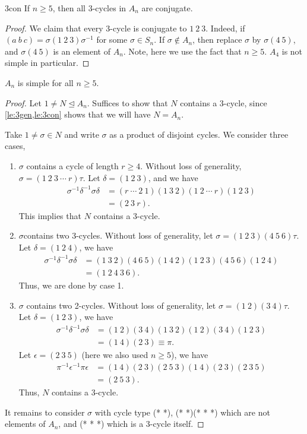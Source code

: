 \begin{lemma}{}{3con}
    If \(n \geq 5\), then all 3-cycles in \(A_n\) are conjugate.
\end{lemma}
\begin{proof}
    We claim that every 3-cycle is conjugate to \(1~2~3\). Indeed, if \((a~b~c) = \sigma(1~2~3)\sigma^{-1}\) for some \(\sigma\in S_n\).
    If \(\sigma \notin A_n\), then replace \(\sigma\) by \(\sigma(4~5)\), and \(\sigma(4~5)\) is an element of \(A_n\). Note, here we use the fact that \(n\geq 5\). \(A_4\) is not simple in particular.
\end{proof}
\begin{theorem}{}{}
    \(A_n\) is simple for all \(n\geq 5\).
\end{theorem}
\begin{proof}
    Let \(1\neq N \trianglelefteq A_n\). Suffices to show that \(N\) contains a 3-cycle, since \cref{le:3gen,le:3con} shows that we will have \(N=A_n\).

    Take \(1\neq \sigma\in N\) and write \(\sigma\) as a product of disjoint cycles. We consider three cases,
    \begin{enumerate}
        \item \(\sigma\) contains a cycle of length \(r \geq 4\). Without loss of generality, \(\sigma = (1~2~3~\cdots~r)\tau\). Let \(\delta = (1~2~3)\), and we have
        \begin{align*}
            \sigma^{-1}\delta^{-1}\sigma\delta &= (r~\cdots~2~1)(1~3~2)(1~2~\cdots~r)(1~2~3)\\
            &=(2~3~r).
        \end{align*}
        This implies that \(N\) contains a 3-cycle.
        \item \(\sigma\)contains two 3-cycles. Without loss of generality, let \(\sigma=(1~2~3)(4~5~6)\tau\). Let \(\delta = (1~2~4)\), we have
        \begin{align*}
            \sigma^{-1}\delta^{-1}\sigma\delta&=(1~3~2)(4~6~5)(1~4~2)(1~2~3)(4~5~6)(1~2~4)\\
            &=(1~2~4~3~6).
        \end{align*}
        Thus, we are done by case 1.
        \item \(\sigma\) contains two 2-cycles. Without loss of generality, let \(\sigma = (1~2)(3~4)\tau\). Let \(\delta = (1~2~3)\), we have
        \begin{align*}
            \sigma^{-1}\delta^{-1}\sigma\delta&=(1~2)(3~4)(1~3~2)(1~2)(3~4)(1~2~3)\\
            &=(1~4)(2~3)\equiv \pi.
        \end{align*}
        Let \(\epsilon = (2~3~5)\) (here we also used \(n \geq 5\)), we have
        \begin{align*}
            \pi^{-1}\epsilon^{-1}\pi\epsilon&=(1~4)(2~3)(2~5~3)(1~4)(2~3)(2~3~5)\\
            &=(2~5~3).
        \end{align*}
        Thus, \(N\) contains a 3-cycle.
    \end{enumerate}
    It remains to consider \(\sigma\) with cycle type (* *), (* *)(* * *) which are not elements of \(A_n\), and (* * *) which is a 3-cycle itself.
\end{proof}